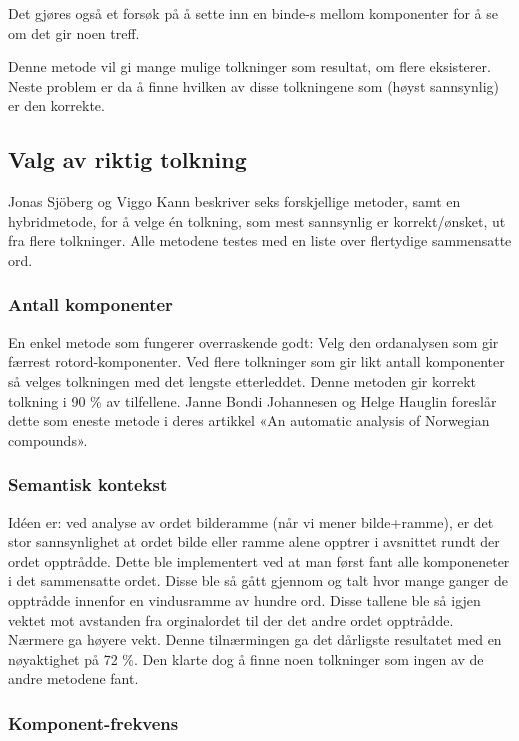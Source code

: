 Det gjøres også et forsøk på å sette inn en binde-s mellom komponenter for å se om det gir noen treff. 

Denne metode vil gi mange mulige tolkninger som resultat, om flere eksisterer. Neste problem er da å finne hvilken av disse tolkningene som (høyst sannsynlig) er den korrekte.

\subsection{Valg av riktig tolkning}
\label{sec:sjoberg}

Jonas Sjöberg og Viggo Kann beskriver seks forskjellige metoder, samt en hybridmetode, for å velge én tolkning, som mest sannsynlig er korrekt/ønsket, ut fra flere tolkninger. Alle metodene testes med en liste over flertydige sammensatte ord.

\subsubsection{Antall komponenter}

En enkel metode som fungerer overraskende godt: Velg den ordanalysen som gir færrest rotord-komponenter. Ved flere tolkninger som gir likt antall komponenter så velges tolkningen med det lengste etterleddet. Denne metoden gir korrekt tolkning i 90 \% av tilfellene. Janne Bondi Johannesen og Helge Hauglin foreslår dette som eneste metode i deres artikkel «An automatic analysis of Norwegian compounds»\cite{johannessen1996automatic}. 

\subsubsection{Semantisk kontekst}

Idéen er: ved analyse av ordet bilderamme (når vi mener bilde+ramme), er det stor sannsynlighet at ordet bilde eller ramme alene opptrer i avsnittet rundt der ordet opptrådde. Dette ble implementert ved at man først fant alle komponeneter i det sammensatte ordet. Disse ble så gått gjennom og talt hvor mange ganger de opptrådde innenfor en vindusramme av hundre ord. Disse tallene ble så igjen vektet mot avstanden fra orginalordet til der det andre ordet opptrådde. Nærmere ga høyere vekt. Denne tilnærmingen ga det dårligste resultatet med en nøyaktighet på 72 \%. Den klarte dog å finne noen tolkninger som ingen av de andre metodene fant.

\subsubsection{Komponent-frekvens}

